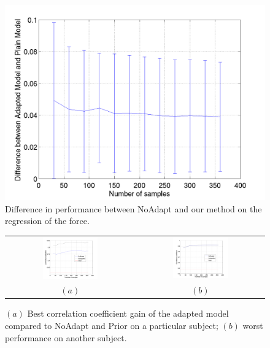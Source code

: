 \begin{figure}[ht]
  \centering
  \includegraphics[width=0.95\linewidth]{figs/exp2}
  \caption{Difference in performance between NoAdapt and our method  on the
 regression of the force.}
  \label{fig:diff_reg}
\end{figure}

\begin{figure}[ht] \centering
  \begin{tabular}{cc}
    \includegraphics[width=0.45\textwidth]{figs/exp2_abs_best} &
    \includegraphics[width=0.45\textwidth]{figs/exp2_abs_worst} \\
    $(a)$ & $(b)$ \\
  \end{tabular}
  \caption{$(a)$ Best correlation coefficient gain of the adapted model compared to NoAdapt
 and Prior on a particular subject; $(b)$ worst performance on another subject.}
  \label{fig:reg_abs}
\end{figure}
